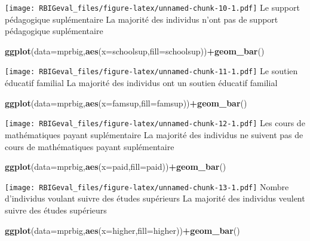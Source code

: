 \documentclass[
]{article}
\newenvironment{Shaded}{\begin{snugshade}}{\end{snugshade}}
\newcommand{\DataTypeTok}[1]{\textcolor[rgb]{0.13,0.29,0.53}{#1}}
\newcommand{\KeywordTok}[1]{\textcolor[rgb]{0.13,0.29,0.53}{\textbf{#1}}}
\newcommand{\NormalTok}[1]{#1}
\newcommand{\OperatorTok}[1]{\textcolor[rgb]{0.81,0.36,0.00}{\textbf{#1}}}
\begin{document}
\texttt{[image: RBIGeval\_files/figure-latex/unnamed-chunk-10-1.pdf]} Le
support pédagogique suplémentaire La majorité des individus n'ont pas de
support pédagogique suplémentaire

\begin{Shaded}
\begin{Highlighting}[]
\KeywordTok{ggplot}\NormalTok{(}\DataTypeTok{data=}\NormalTok{mprbig,}\KeywordTok{aes}\NormalTok{(}\DataTypeTok{x=}\NormalTok{schoolsup,}\DataTypeTok{fill=}\NormalTok{schoolsup))}\OperatorTok{+}\KeywordTok{geom_bar}\NormalTok{()}
\end{Highlighting}
\end{Shaded}

\texttt{[image: RBIGeval\_files/figure-latex/unnamed-chunk-11-1.pdf]} Le
soutien éducatif familial La majorité des individus ont un soutien
éducatif familial

\begin{Shaded}
\begin{Highlighting}[]
\KeywordTok{ggplot}\NormalTok{(}\DataTypeTok{data=}\NormalTok{mprbig,}\KeywordTok{aes}\NormalTok{(}\DataTypeTok{x=}\NormalTok{famsup,}\DataTypeTok{fill=}\NormalTok{famsup))}\OperatorTok{+}\KeywordTok{geom_bar}\NormalTok{()}
\end{Highlighting}
\end{Shaded}

\texttt{[image: RBIGeval\_files/figure-latex/unnamed-chunk-12-1.pdf]} Les
cours de mathématiques payant suplémentaire La majorité des individus ne
suivent pas de cours de mathématiques payant suplémentaire

\begin{Shaded}
\begin{Highlighting}[]
\KeywordTok{ggplot}\NormalTok{(}\DataTypeTok{data=}\NormalTok{mprbig,}\KeywordTok{aes}\NormalTok{(}\DataTypeTok{x=}\NormalTok{paid,}\DataTypeTok{fill=}\NormalTok{paid))}\OperatorTok{+}\KeywordTok{geom_bar}\NormalTok{()}
\end{Highlighting}
\end{Shaded}

\texttt{[image: RBIGeval\_files/figure-latex/unnamed-chunk-13-1.pdf]}
Nombre d'individus voulant suivre des études supérieurs La majorité des
individus veulent suivre des études supérieurs

\begin{Shaded}
\begin{Highlighting}[]
\KeywordTok{ggplot}\NormalTok{(}\DataTypeTok{data=}\NormalTok{mprbig,}\KeywordTok{aes}\NormalTok{(}\DataTypeTok{x=}\NormalTok{higher,}\DataTypeTok{fill=}\NormalTok{higher))}\OperatorTok{+}\KeywordTok{geom_bar}\NormalTok{()}
\end{Highlighting}
\end{Shaded}
\end{document}
